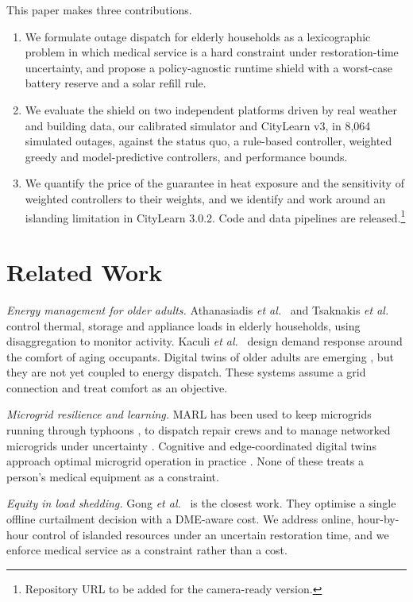 \documentclass[conference]{IEEEtran}
\begin{document}
This paper makes three contributions.
\begin{enumerate}
\item We formulate outage dispatch for elderly households as a lexicographic problem in which medical service is a hard constraint under restoration-time uncertainty, and propose a policy-agnostic runtime shield with a worst-case battery reserve and a solar refill rule.
\item We evaluate the shield on two independent platforms driven by real weather and building data, our calibrated simulator and CityLearn v3, in 8,064 simulated outages, against the status quo, a rule-based controller, weighted greedy and model-predictive controllers, and performance bounds.
\item We quantify the price of the guarantee in heat exposure and the sensitivity of weighted controllers to their weights, and we identify and work around an islanding limitation in CityLearn 3.0.2. Code and data pipelines are released.\footnote{Repository URL to be added for the camera-ready version.}
\end{enumerate}

\section{Related Work}
\textit{Energy management for older adults.} Athanasiadis \textit{et al.}\ \cite{athanasiadis2022sems} and Tsaknakis \textit{et al.}\ \cite{tsaknakis2023nearly} control thermal, storage and appliance loads in elderly households, using disaggregation to monitor activity. Kaculi \textit{et al.}\ \cite{kaculi2025human} design demand response around the comfort of aging occupants. Digital twins of older adults are emerging \cite{lehmann2024twins,momand2025twins}, but they are not yet coupled to energy dispatch. These systems assume a grid connection and treat comfort as an objective.

\textit{Microgrid resilience and learning.} MARL has been used to keep microgrids running through typhoons \cite{wu2026marl}, to dispatch repair crews \cite{qiu2023repair} and to manage networked microgrids under uncertainty \cite{esan2026lean}. Cognitive and edge-coordinated digital twins approach optimal microgrid operation in practice \cite{sivaneasan2025cognitive,vanitha2025cet}. None of these treats a person's medical equipment as a constraint.

\textit{Equity in load shedding.} Gong \textit{et al.}\ \cite{gong2026dilemma} is the closest work. They optimise a single offline curtailment decision with a DME-aware cost. We address online, hour-by-hour control of islanded resources under an uncertain restoration time, and we enforce medical service as a constraint rather than a cost.
\end{document}

